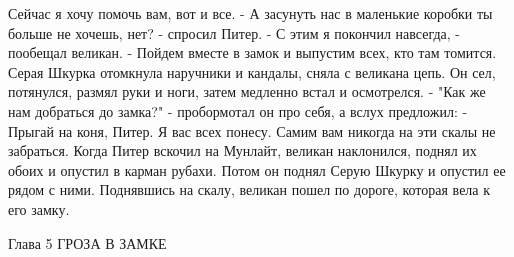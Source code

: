 Сейчас я хочу помочь вам, вот и все.
    - А засунуть нас в маленькие коробки ты больше не хочешь, нет? - 
спросил Питер.
    - С этим я покончил навсегда, - пообещал великан. - Пойдем вместе 
в замок и выпустим всех, кто там томится.
    Серая Шкурка отомкнула наручники и кандалы, сняла с великана цепь. 
Он сел, потянулся, размял руки и ноги, затем медленно встал и 
осмотрелся.
    - "Как же нам добраться до замка?" - пробормотал он про себя, а 
вслух предложил: - Прыгай на коня, Питер. Я вас всех понесу. Самим вам 
никогда на эти скалы не забраться.
    Когда Питер вскочил на Мунлайт, великан наклонился, поднял их 
обоих и опустил в карман рубахи. Потом он поднял Серую Шкурку и 
опустил ее рядом с ними. Поднявшись на скалу, великан пошел по дороге, 
которая вела к его замку.

        Глава 5
        ГРОЗА В ЗАМКЕ

